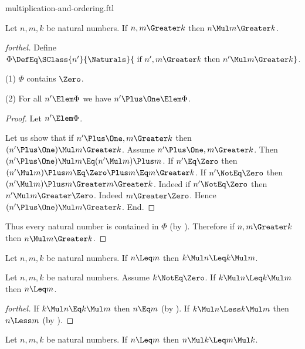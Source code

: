 \documentclass{stex}
\begin{document}
\begin{smodule}{multiplication-and-ordering.ftl}
\begin{proposition*}[forthel]
  Let $n, m, k$ be natural numbers.
  If $n, m \Greater k$ then $n \Mul m \Greater k$.
\end{proposition*}
\begin{proof}[forthel]
  Define $\Phi \DefEq \SClass{n'}{\Naturals}{\text{ if }n', m \Greater k\text{ then }n' \Mul m \Greater k}$.

  (1) $\Phi$ contains $\Zero$.

  (2) For all $n' \Elem \Phi$ we have $n' \Plus \One \Elem \Phi$.
  \begin{proof}
    Let $n' \Elem \Phi$.

    Let us show that if $n' \Plus \One, m \Greater k$ then $(n' \Plus \One) \Mul m \Greater k$.
      Assume $n' \Plus \One, m \Greater k$.
      Then $(n' \Plus \One) \Mul m \Eq (n' \Mul m) \Plus m$.
      If $n' \Eq \Zero$ then
      $(n' \Mul m) \Plus m
        \Eq \Zero \Plus m
        \Eq m
        \Greater k$.
      If $n' \NotEq \Zero$ then
      $(n' \Mul m) \Plus m
        \Greater m
        \Greater k$.
      Indeed if $n' \NotEq \Zero$ then $n' \Mul m \Greater \Zero$.
      Indeed $m \Greater \Zero$.
      Hence $(n' \Plus \One) \Mul m \Greater k$.
    End.
  \end{proof}

  Thus every natural number is contained in $\Phi$ (by ).
  Therefore if $n, m \Greater k$ then $n \Mul m \Greater k$.
\end{proof}

\begin{proposition*}[forthel]
  Let $n, m, k$ be natural numbers.
  If $n \Leq m$ then $k \Mul n \Leq k \Mul m$.
\end{proposition*}

\begin{proposition*}[forthel]
  Let $n, m, k$ be natural numbers.
  Assume $k \NotEq \Zero$.
  If $k \Mul n \Leq k \Mul m$ then $n \Leq m$.
\end{proposition*}
\begin{proof}[forthel]
  If $k \Mul n \Eq k \Mul m$ then $n \Eq m$ (by ).
  If $k \Mul n \Less k \Mul m$ then $n \Less m$ (by ).
\end{proof}

\begin{proposition*}[forthel]
  Let $n, m, k$ be natural numbers.
  If $n \Leq m$ then $n \Mul k \Leq m \Mul k$.
\end{proposition*}


\end{smodule}
\end{document}
